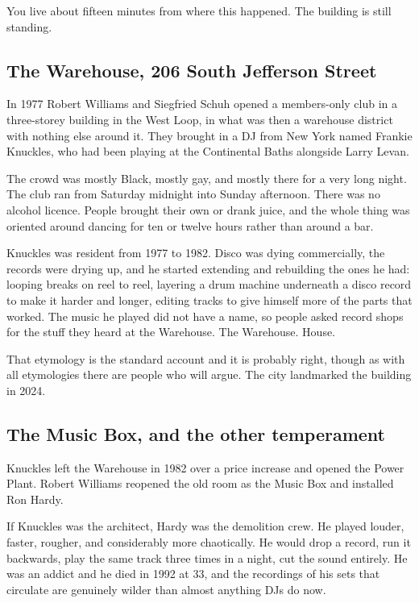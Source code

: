 You live about fifteen minutes from where this happened. The building is still standing.

\subsection{The Warehouse, 206 South Jefferson Street}\label{th02_chicago-the-warehouse-206-south-jefferson-street}

In 1977 Robert Williams and Siegfried Schuh opened a members-only club in a three-storey
building in the West Loop, in what was then a warehouse district with nothing else around
it. They brought in a DJ from New York named Frankie Knuckles, who had been playing at the
Continental Baths alongside Larry Levan.

The crowd was mostly Black, mostly gay, and mostly there for a very long night. The club ran
from Saturday midnight into Sunday afternoon. There was no alcohol licence. People brought
their own or drank juice, and the whole thing was oriented around dancing for ten or twelve
hours rather than around a bar.

Knuckles was resident from 1977 to 1982. Disco was dying commercially, the records were
drying up, and he started extending and rebuilding the ones he had: looping breaks on reel
to reel, layering a drum machine underneath a disco record to make it harder and longer,
editing tracks to give himself more of the parts that worked. The music he played did not
have a name, so people asked record shops for the stuff they heard at the Warehouse. The
Warehouse. House.

That etymology is the standard account and it is probably right, though as with all
etymologies there are people who will argue. The city landmarked the building in 2024.

\subsection{The Music Box, and the other temperament}\label{th02_chicago-the-music-box-and-the-other-temperament}

Knuckles left the Warehouse in 1982 over a price increase and opened the Power Plant.
Robert Williams reopened the old room as the Music Box and installed Ron Hardy.

If Knuckles was the architect, Hardy was the demolition crew. He played louder, faster,
rougher, and considerably more chaotically. He would drop a record, run it backwards, play
the same track three times in a night, cut the sound entirely. He was an addict and he died
in 1992 at 33, and the recordings of his sets that circulate are genuinely wilder than
almost anything DJs do now.

